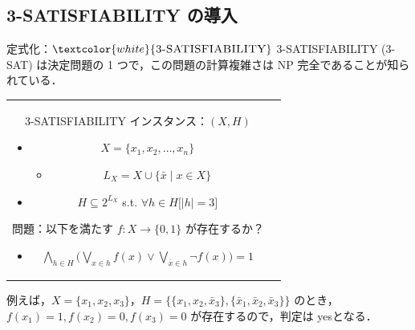 \documentclass[dvipdfmx]{beamer}
\begin{document}
\subsection{\textsc{3-SATISFIABILITY} の導入}
\begin{frame}{定式化：${\textcolor{white}{\mbox {\sc 3-SATISFIABILITY}}}$}
  \textsc{3-SATISFIABILITY (3-SAT) } は決定問題の 1 つで，この問題の計算複雑さは NP  完全であることが知られている．
  \begin{tabular}{cc}
    \begin{minipage}[]{0.7\hsize}
      \begin{block}{\textsc{3-SATISFIABILITY}}
        インスタンス：$(X,H)$
        \begin{itemize}
          \item $X=\{x_1,x_2,\dots ,x_n\}$
          \begin{itemize}
            \item $L_X = X \cup \{\bar x \mid x \in X\}$
          \end{itemize}
          \item $H \subseteq 2^{L_X}$ s.t. $\forall h \in H \big[|h| = 3\big]$
        \end{itemize}
        問題：以下を満たす $f : X \to \{0,1\}$ が存在するか？
        \begin{itemize}
          \item $\displaystyle \bigwedge_{h \in H} \bigg(\bigvee_{x \in h}f(x) \lor \bigvee_{\bar x \in h}\lnot f(x) \bigg) = 1$
        \end{itemize}
      \end{block}
    \end{minipage}
    \begin{minipage}[c]{0.3\hsize}
    \end{minipage}
    \vspace{3mm}
  \end{tabular}

  例えば，$X = \{x_1,x_2,x_3\}$，$H = \big\{ \{x_1, x_2, \bar x_3\}, \{\bar x_1, \bar x_2,\bar x_3\}\big\}$ のとき，
  $f(x_1) = 1, f(x_2) = 0, f(x_3) = 0$ が存在するので，判定は yesとなる．
\end{frame}
\end{document}
